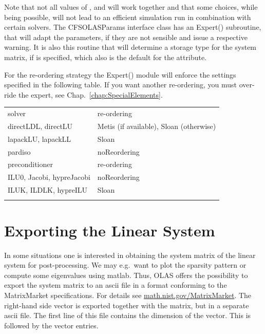 %
%
Note that not all values of ,  and 
will work together and that some choices, while being possible, will not lead
to an efficient simulation run in combination with certain solvers. The
CFSOLASParams interface class has an Expert() subroutine, that will adapt the
parameters, if they are not sensible and issue a respective warning. It is also
this routine that will determine a storage type for the system matrix, if
 is specified, which also is the default for the
 attribute.

For the re-ordering strategy the Expert() module will enforce the settings
specified in the following table. If you want another re-ordering, you must
over-ride the expert, see Chap.~\ref{chap:SpecialElements}.
%
%
\begin{center}
\begin{longtable}{ll}
\hline\noalign{\smallskip}
solver              & re-ordering                             \\
\noalign{\smallskip}\hline\noalign{\smallskip}
directLDL, directLU & Metis (if available), Sloan (otherwise) \\
lapackLU, lapackLL  & Sloan                                   \\
pardiso             & noReordering                            \\
\noalign{\smallskip}\hline\noalign{\smallskip}
preconditioner      & re-ordering                             \\
\noalign{\smallskip}\hline\noalign{\smallskip}
ILU0, Jacobi, hypreJacobi & noReordering                      \\
ILUK, ILDLK, hypreILU    & Sloan                              \\
\noalign{\smallskip}\hline
\end{longtable}
\end{center}
%
%
\section{Exporting the Linear System}
%
%
In some situations one is interested in obtaining the system matrix of the
linear system for post-processing. We may e.g.~want to plot the sparsity
pattern or compute some eigenvalues using matlab. Thus, OLAS offers the
possibility to export the system matrix to an ascii file in a format conforming
to the MatrixMarket specifications. For details see
\url{math.nist.gov/MatrixMarket}. The right-hand side vector is exported
together with the matrix, but in a separate ascii file. The first line of this
file contains the dimension of the vector. This is followed by the vector
entries.

